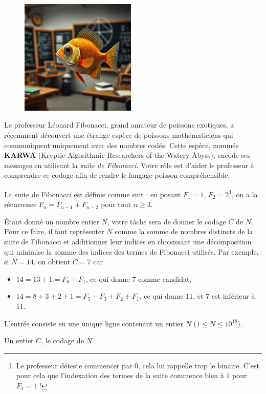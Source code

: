 
\begin{figure}
    \centering
    \includegraphics[width=5.5cm]{Fibofish.jpeg}
\end{figure}

Le professeur Léonard Fibonacci, grand amateur de poissons exotiques, a récemment découvert une étrange espèce de poissons mathématiciens qui communiquent uniquement avec des nombres codés. Cette espèce, nommée \textbf{KARWA} (Kryptic Algorithmic Researchers of the Watery Abyss), encode ses messages en utilisant la \textit{suite de Fibonacci}. Votre rôle est d'aider le professeur à comprendre ce codage afin de rendre le langage poisson compréhensible.

La suite de Fibonacci est définie comme suit : en posant $F_1 = 1$, $F_2 = 2$\footnote{Le professeur déteste commencer par $0$, cela lui rappelle trop le binaire. C'est pour cela que l'indexation des termes de la suite commence bien à $1$ pour $F_1 = 1$ !}, on a la récurrence $F_n = F_{n-1} + F_{n-2}$ pour tout $n \geq 3$.

Étant donné un nombre entier $N$, votre tâche sera de donner le codage $C$ de $N$. Pour ce faire, il faut représenter $N$ comme la somme de nombres distincts de la suite de Fibonacci et additionner leur indices en choisissant une décomposition qui minimise la somme des indices des termes de Fibonacci utilisés. Par exemple, si $N = 14$, on obtient $C = 7$ car
\begin{itemize}
    \item $14 = 13 + 1 = F_6 + F_1$, ce qui donne $7$ comme candidat,
    \item $14 = 8 + 3 + 2 + 1 = F_5 + F_3 + F_2 + F_1$, ce qui donne $11$, et $7$ est inférieur à $11$.
\end{itemize}

\begin{Input}
    L'entrée consiste en une unique ligne contenant un entier $N$ ($1 \leq N \leq 10^{18}$).
\end{Input}

\begin{Output}
    Un entier $C$, le codage de $N$.
\end{Output}
